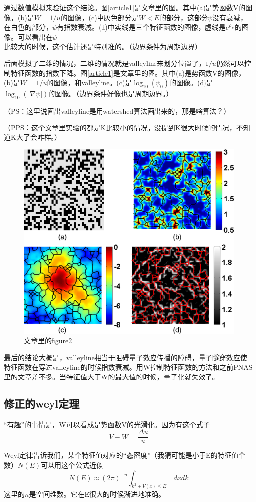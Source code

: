 \documentclass[UTF8,12pt]{article}
\begin{document}
通过数值模拟来验证这个结论。图\ref{article1}是文章里的图。其中(a)是势函数V的图像，(b)是$W = 1/u$的图像，(c)中灰色部分是$W<E$的部分，这部分$\psi$没有衰减，在白色的部分，$\psi$有指数衰减。(d)中实线是三个特征函数的图像，虚线是$e^{\rho_E}$的图像。可以看出在$\psi$比较大的时候，这个估计还是特别准的。（边界条件为周期边界）

后面模拟了二维的情况，二维的情况就是valleyline来划分位置了，$1/u$仍然可以控制特征函数的指数下降。图\ref{article1}是文章里的图。其中(a)是势函数V的图像，(b)是$W = 1/u$的图像，和valleyline。(c)是$\log_{10} (\psi_0)$的图像。(d)是$\log_{10} (|\nabla \psi|)$的图像。（边界条件好像也是周期边界。）

（PS：这里说画出valleyline是用watershed算法画出来的，那是啥算法？）

（PPS：这个文章里实验的都是K比较小的情况，没提到K很大时候的情况，不知道K大了会咋样。）

\begin{figure}[htbp]
\centering
\includegraphics[width=0.7\linewidth]{article2}
\caption{文章里的figure2}
\label{article2}
\end{figure}

最后的结论大概是，valleyline相当于阻碍量子效应传播的障碍，量子隧穿效应使特征函数在穿过valleyline的时候指数衰减。用W控制特征函数的方法和之前PNAS里的文章差不多。当特征值大于W的最大值的时候，量子化就失效了。

\subsection{修正的weyl定理}

“有趣”的事情是，W可以看成是势函数V的光滑化。因为有这个式子
$$ V - W = \frac{\Delta u}{u} $$

Weyl定律告诉我们，某个特征值对应的“态密度”（我猜可能是小于E的特征值个数）$N(E)$可以用这个公式近似
$$ N(E) \approx (2 \pi)^{-n} \int_{k^2 + V(x) \leq E} \ dx dk $$
这里的$n$是空间维数。它在E很大的时候渐进地准确。
\end{document}
